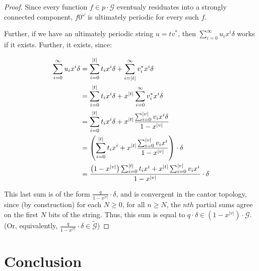 \documentclass[12pt]{article}
\newcommand{\G}{\mathcal{G}}
\newcommand{\2}{\textbf{2}}
\begin{document}
\begin{proof}
  Since every function $f \in p \cdot \G$ eventualy residuates into a 
  strongly connected component, $f 0^\omega$ is ultimately periodic for
  every such $f$.

  Further, if we have an ultimately periodic string $u = tv^*$, then
  $\sum_{i=0}^{\infty} u_i x^i \delta$ works if it exists. Further,
  it exists, since:

  \begin{align*}
    \sum_{i=0}^{\infty} u_i x^i \delta 
    &= \sum_{i=0}^{|t|} t_i x^i \delta 
        + \sum_{i=|t|}^{\infty} v^*_i x^i \delta\\
    &= \sum_{i=0}^{|t|} t_i x^i \delta 
        + x^{|t|} \sum_{i=0}^{\infty} v^*_i x^i \delta\\
    &= \sum_{i=0}^{|t|} t_i x^i \delta 
         + x^{|t|} \frac{\sum_{i=0}^{|v|} v_i x^i \delta}{1 - x^{|v|}}\\
    &= \left ( 
        \sum_{i=0}^{|t|} t_i x^i
        + x^{|t|} \frac{\sum_{i=0}^{|v|} v_i x^i}{1 - x^{|v|}}
       \right ) \cdot \delta\\
    &= \frac%
        {%
          \left ( 1 - x^{|v|} \right ) \sum_{i=0}^{|t|} t_i x^i + 
          x^{|t|} \sum_{i=0}^{|v|} v_i x^i
        }
        {1 - x^{|v|}}
       \cdot \delta\\
  \end{align*}
   

  This last sum is of the form $\frac{q}{1 - x^{|v|}} \cdot \delta$, 
  and is convergent in the cantor topology, since (by construction)
  for each $N \geq 0$, for all $n \geq N$, the $nth$ partial sums 
  agree on the first $N$ bits of the string.
  Thus, this sum is equal to $q \cdot \delta \in (1 - x^{|v|}) \cdot \G$.
  (Or, equivalently, $\frac{q}{1 - x^{|v|}} \cdot \delta \in \widetilde{\G}$)
\end{proof}

\section{Conclusion}


\end{document}
